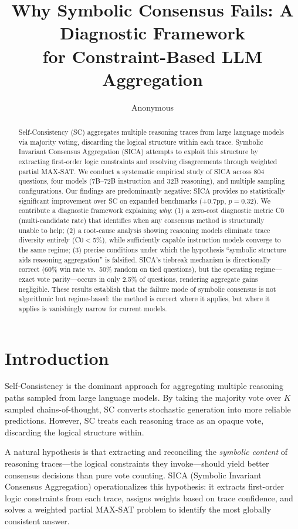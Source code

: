 \documentclass[11pt]{article}
\title{Why Symbolic Consensus Fails: A Diagnostic Framework\\for Constraint-Based LLM Aggregation}
\author{Anonymous}
\date{}
\begin{document}
\maketitle

\begin{abstract}
Self-Consistency (SC) aggregates multiple reasoning traces from large language models via majority voting, discarding the logical structure within each trace. Symbolic Invariant Consensus Aggregation (SICA) attempts to exploit this structure by extracting first-order logic constraints and resolving disagreements through weighted partial MAX-SAT. We conduct a systematic empirical study of SICA across 804 questions, four models (7B--72B instruction and 32B reasoning), and multiple sampling configurations. Our findings are predominantly negative: SICA provides no statistically significant improvement over SC on expanded benchmarks ($+0.7$pp, $p=0.32$). We contribute a diagnostic framework explaining \emph{why}: (1) a zero-cost diagnostic metric C0 (multi-candidate rate) that identifies when any consensus method is structurally unable to help; (2) a root-cause analysis showing reasoning models eliminate trace diversity entirely (C0$<$5\%), while sufficiently capable instruction models converge to the same regime; (3) precise conditions under which the hypothesis ``symbolic structure aids reasoning aggregation'' is falsified. SICA's tiebreak mechanism is directionally correct (60\% win rate vs.\ 50\% random on tied questions), but the operating regime---exact vote parity---occurs in only 2.5\% of questions, rendering aggregate gains negligible. These results establish that the failure mode of symbolic consensus is not algorithmic but regime-based: the method is correct where it applies, but where it applies is vanishingly narrow for current models.
\end{abstract}

\section{Introduction}

Self-Consistency \citep{wang2023selfconsistency} is the dominant approach for aggregating multiple reasoning paths sampled from large language models. By taking the majority vote over $K$ sampled chains-of-thought, SC converts stochastic generation into more reliable predictions. However, SC treats each reasoning trace as an opaque vote, discarding the logical structure within.

A natural hypothesis is that extracting and reconciling the \emph{symbolic content} of reasoning traces---the logical constraints they invoke---should yield better consensus decisions than pure vote counting. SICA (Symbolic Invariant Consensus Aggregation) operationalizes this hypothesis: it extracts first-order logic constraints from each trace, assigns weights based on trace confidence, and solves a weighted partial MAX-SAT problem to identify the most globally consistent answer.
\end{document}
